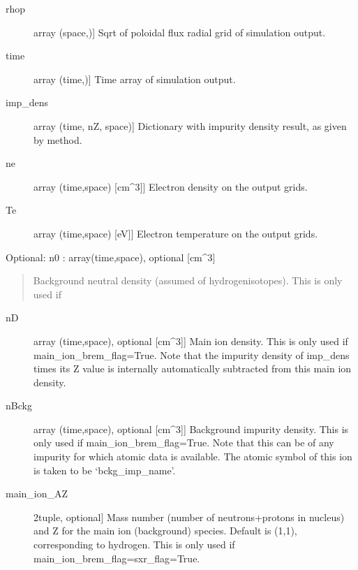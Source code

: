 \documentclass[letterpaper,10pt,english]{sphinxmanual}
\begin{document}
\begin{fulllineitems}
\begin{description}
\begin{description}
\item[{rhop}] \leavevmode{[}array (space,){]}
Sqrt of poloidal flux radial grid of simulation output.

\item[{time}] \leavevmode{[}array (time,){]}
Time array of simulation output.

\item[{imp\_dens}] \leavevmode{[}array (time, nZ, space){]}
Dictionary with impurity density result, as given by  method.

\item[{ne}] \leavevmode{[}array (time,space) {[}cm\textasciicircum{}\sphinxhyphen{}3{]}{]}
Electron density on the output grids.

\item[{Te}] \leavevmode{[}array (time,space) {[}eV{]}{]}
Electron temperature on the output grids.

\end{description}

Optional: 
n0 : array(time,space), optional {[}cm\textasciicircum{}\sphinxhyphen{}3{]}
\begin{quote}

Background neutral density (assumed of hydrogen\sphinxhyphen{}isotopes). 
This is only used if
\end{quote}
\begin{description}
\item[{nD}] \leavevmode{[}array (time,space), optional {[}cm\textasciicircum{}\sphinxhyphen{}3{]}{]}
Main ion density. This is only used if main\_ion\_brem\_flag=True.
Note that the impurity density of imp\_dens times its Z value is internally 
automatically subtracted from this main ion density.

\item[{nBckg}] \leavevmode{[}array (time,space), optional {[}cm\textasciicircum{}\sphinxhyphen{}3{]}{]}
Background impurity density. This is only used if main\_ion\_brem\_flag=True.
Note that this can be of any impurity for which atomic data is available. The atomic 
symbol of this ion is taken to be ‘bckg\_imp\_name’.

\item[{main\_ion\_AZ}] \leavevmode{[}2\sphinxhyphen{}tuple, optional{]}
Mass number (number of neutrons+protons in nucleus) and Z for the main ion 
(background) species. Default is (1,1), corresponding to hydrogen. 
This is only used if main\_ion\_brem\_flag=sxr\_flag=True.


\end{description}
\end{description}
\end{fulllineitems}
\end{document}
